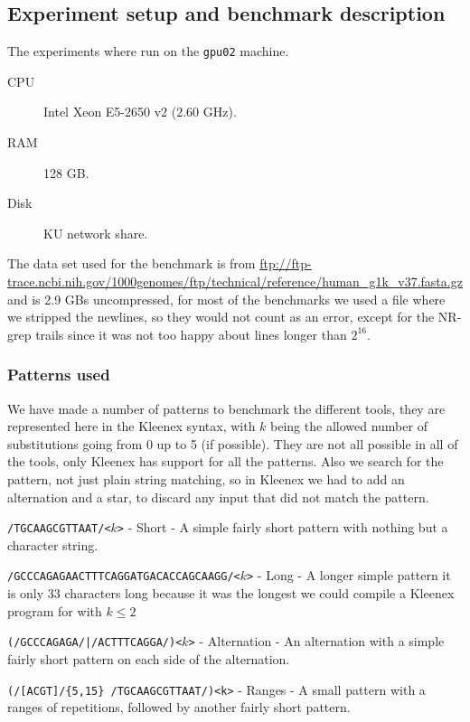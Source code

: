 \subsection{Experiment setup and benchmark description}
The experiments where run on the \texttt{gpu02} machine.
\begin{description}
    \item[CPU] Intel Xeon E5-2650 v2 (2.60 GHz).
    \item[RAM] 128 GB.
    \item[Disk] KU network share.
\end{description}

The data set used for the benchmark is from
\url{ftp://ftp-trace.ncbi.nih.gov/1000genomes/ftp/technical/reference/human_g1k_v37.fasta.gz}
and is 2.9 GBs uncompressed, for most of the benchmarks we used a file where we
stripped the newlines, so they would not count as an error, except for the
NR-grep trails since it was not too happy about lines longer than $2^{16}$.

\subsubsection{Patterns used}
We have made a number of patterns to benchmark the different tools, they are
represented here in the Kleenex syntax, with $k$ being the allowed number of
substitutions going from 0 up to 5 (if possible). They are not all possible in
all of the tools, only Kleenex has support for all the patterns. Also we search
for the pattern, not just plain string matching, so in Kleenex we had to add an
alternation and a star, to discard any input that did not match the pattern.

\texttt{/TGCAAGCGTTAAT/<$k$>} - Short - A simple fairly short pattern with
nothing but a character string.

\texttt{/GCCCAGAGAACTTTCAGGATGACACCAGCAAGG/<$k$>} - Long - A longer simple
pattern it is only 33 characters long because it was the longest we could
compile a Kleenex program for with $k \leq 2$

\texttt{(/GCCCAGAGA/|/ACTTTCAGGA/)<$k$>} - Alternation - An alternation with a
simple fairly short pattern on each side of the alternation.

\texttt{(/[ACGT]/\{5,15\} /TGCAAGCGTTAAT/)<k>} - Ranges - A small pattern with
a ranges of repetitions, followed by another fairly short pattern.


